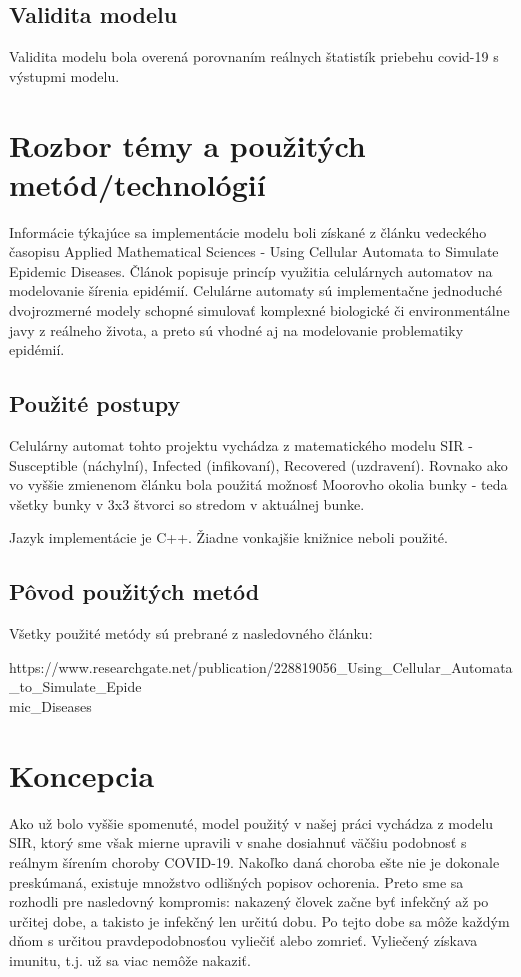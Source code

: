 \documentclass[12pt,a4paper,titlepage]{article}
\begin{document}
\subsection{Validita modelu}
Validita modelu bola overená porovnaním reálnych štatistík priebehu covid-19 s výstupmi modelu. 

\section{Rozbor témy a použitých metód/technológií}
Informácie týkajúce sa implementácie modelu boli získané z článku vedeckého časopisu Applied Mathematical Sciences - Using Cellular Automata to Simulate Epidemic Diseases.\cite{Zdroj}
Článok popisuje princíp využitia celulárnych automatov na modelovanie šírenia epidémií. Celulárne automaty sú implementačne jednoduché dvojrozmerné modely schopné simulovať komplexné biologické či environmentálne javy z reálneho života, a preto sú vhodné aj na modelovanie problematiky epidémií.

\subsection{Použité postupy}
Celulárny automat tohto projektu vychádza z matematického modelu SIR - Susceptible (náchylní), Infected (infikovaní), Recovered (uzdravení). Rovnako ako vo vyššie zmienenom článku bola použitá možnosť Moorovho okolia bunky - teda všetky bunky v 3x3 štvorci so stredom v aktuálnej bunke.

\noindent Jazyk implementácie je C++. Žiadne vonkajšie knižnice neboli použité.

\subsection{Pôvod použitých metód}
Všetky použité metódy sú prebrané z nasledovného článku:

\noindent https://www.researchgate.net/publication/228819056\_Using\_Cellular\_Automata\_to\_Simulate\_Epide\\mic\_Diseases

\section{Koncepcia}
Ako už bolo vyššie spomenuté, model použitý v našej práci vychádza z modelu SIR, ktorý sme však mierne upravili v snahe dosiahnuť väčšiu podobnosť s reálnym šírením choroby COVID-19. Nakoľko daná choroba ešte nie je dokonale preskúmaná, existuje množstvo odlišných popisov ochorenia. Preto sme sa rozhodli pre nasledovný kompromis: nakazený človek začne byť infekčný až po určitej dobe, a takisto je infekčný len určitú dobu. Po tejto dobe sa môže každým dňom s určitou pravdepodobnosťou vyliečiť alebo zomrieť. Vyliečený získava imunitu, t.j. už sa viac nemôže nakaziť.
\end{document}
